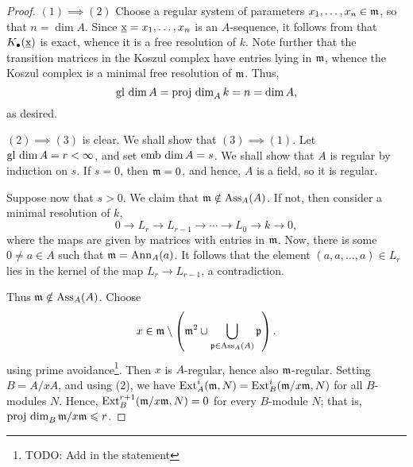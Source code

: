 \begin{proof}
    $(1)\implies(2)$ Choose a regular system of parameters $x_1,\dots,x_n\in\mathfrak{m}$, so that $n = \dim A$. Since $\underbar{x} = x_1,\dots,x_n$ is an $A$-sequence, it follows from  that $K_\bullet(\underbar{x})$ is exact, whence it is a free resolution of $k$. Note further that the transition matrices in the Koszul complex have entries lying in $\mathfrak{m}$, whence the Koszul complex is a minimal free resolution of $\mathfrak{m}$. Thus, 
    \begin{equation*}
        \operatorname{gl~dim} A = \operatorname{proj~dim}_A k = n = \dim A,
    \end{equation*}
    as desired. 

    $(2)\implies(3)$ is clear. We shall show that $(3)\implies(1)$. Let $\operatorname{gl~dim} A = r < \infty$, and set $\operatorname{emb~dim} A = s$. We shall show that $A$ is regular by induction on $s$. If $s = 0$, then $\mathfrak{m} = 0$, and hence, $A$ is a field, so it is regular. 

    Suppose now that $s > 0$. We claim that $\mathfrak{m}\notin\operatorname{Ass}_A(A)$. If not, then consider a minimal resolution of $k$, 
    \begin{equation*}
        0\to L_r\to L_{r - 1}\to\cdots\to L_0\to k\to 0,
    \end{equation*}
    where the maps are given by matrices with entries in $\mathfrak{m}$. Now, there is some $0\ne a\in A$ such that $\mathfrak{m} = \operatorname{Ann}_A(a)$. It follows that the element $(a,a,\dots,a)\in L_r$ lies in the kernel of the map $L_r\to L_{r - 1}$, a contradiction. 

    Thus $\mathfrak{m}\notin\operatorname{Ass}_A(A)$. Choose 
    \begin{equation*}
        x\in\mathfrak{m}\setminus\left(\mathfrak{m}^2\cup\bigcup_{\mathfrak{p}\in\operatorname{Ass}_A(A)}\mathfrak{p}\right).
    \end{equation*}
    using prime avoidance\footnote{TODO: Add in the statement}. Then $x$ is $A$-regular, hence also $\mathfrak{m}$-regular. Setting $B = A/xA$, and using  (2), we have $\operatorname{Ext}^i_A(\mathfrak{m}, N) = \operatorname{Ext}^i_B(\mathfrak{m}/x\mathfrak{m}, N)$ for all $B$-modules $N$. Hence, $\operatorname{Ext}^{r + 1}_B(\mathfrak{m}/x\mathfrak{m}, N) = 0$ for every $B$-module $N$; that is, $\operatorname{proj~dim}_B \mathfrak{m}/x\mathfrak{m}\leqslant r$.


\end{proof}
